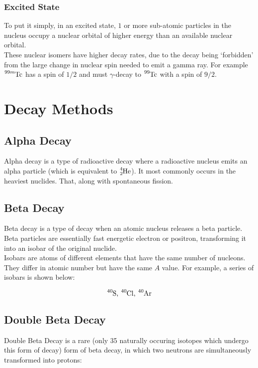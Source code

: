 \documentclass{article}
\begin{document}
\begin{multicols*}{2}
    \subsubsection{Excited State}
    To put it simply, in an excited state, $1$ or more sub-atomic particles in
    the nucleus occupy a nuclear orbital of higher energy than an available
    nuclear orbital.\\
    
    These nuclear isomers have higher decay rates, due to the decay being
    `forbidden' from the large change in nuclear spin needed to emit a
    gamma ray. For example $\ce{^{99m}Tc}$ has a spin of $1/2$ and must
    $\gamma$-decay to $\ce{^{99}Tc}$ with a spin of $9/2$.

    \section{Decay Methods}
    \subsection{Alpha Decay}
    Alpha decay is a type of radioactive decay where a radioactive nucleus
    emits an alpha particle (which is equivalent to $\ce{^4_2He}$). It most
    commonly occurs in the heaviest nuclides. That, along with spontaneous
    fission.

    \subsection{Beta Decay}
    Beta decay is a type of decay when an atomic nucleus releases a beta
    particle. Beta particles are essentially fast energetic electron or
    positron, transforming it into an isobar of the original nuclide.\\

    Isobars are atoms of different elements that have the same number of
    nucleons. They differ in atomic number but have the same $A$ value.
    For example, a series of isobars is shown below:

    \[
      \ce{^{40}S}\text{, }\ce{^{40}Cl}\text{, }\ce{^{40}Ar}
    \]

    \subsection{Double Beta Decay}
    Double Beta Decay is a rare (only 35 naturally occuring isotopes which
    undergo this form of decay) form of beta decay, in which two neutrons
    are simultaneously transformed into protons:


\end{multicols*}
\end{document}
